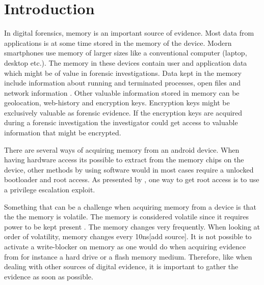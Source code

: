 \section{Introduction}


In digital forensics, memory is an important source of evidence. Most data from applications
is at some time stored in the memory of the device. Modern smartphones use memory of larger sizes like 
a conventional computer (laptop, desktop etc.). The memory in these devices contain user and 
application data which might be of value in forensic investigations. Data kept in the memory include 
information about running and terminated processes, open files and network information 
\cite{acq_vol_android_mem}. Other valuable information stored in memory can be geolocation, web-history 
and encryption keys. Encryption keys might be exclusively valuable as forensic evidence.
If the encryption keys are acquired during a forensic investigation the investigator could get access to 
valuable information that might be encrypted.

There are several ways of acquiring memory from an android device. When having hardware access its possible to extract from the memory chips on the device, other methods by using software would in most cases require a unlocked bootloader and root access. As presented by \cite{acq_vol_android_mem}, one way to get root access is to use a privilege escalation exploit. %




Something that can be a challenge when acquiring memory from a device is that the the memory is 
volatile. The memory is considered volatile since it requires power to be kept present \cite{the_art_of_mem}.
The memory changes very frequently. When looking at order of volatility, memory changes 
every 10ns[add source]. It is not possible to activate a write-blocker on memory as one would do when 
acquiring evidence from for instance a hard drive or a flash memory medium. Therefore, like when dealing with other sources of digital
evidence, it is important to gather the evidence as soon as possible. 

